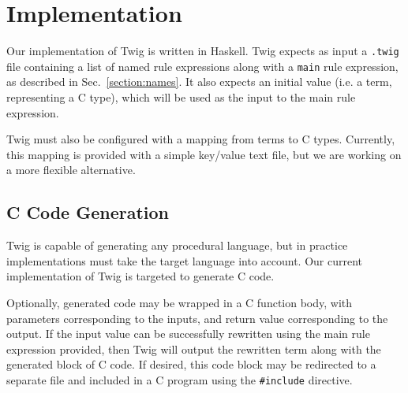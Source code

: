 
\section{Implementation}

Our implementation of Twig is written in Haskell. Twig expects as input a \texttt{.twig} file containing a list of named rule expressions along with a \texttt{main} rule expression, as described in Sec.~\ref{section:names}. It also expects an initial value (i.e. a term, representing a C type), which will be used as the input to the main rule expression.

Twig must also be configured with a mapping from terms to C types. Currently, this mapping is provided with a simple key/value text file, but we are working on a more flexible alternative.

\subsection{C Code Generation}

Twig is capable of generating any procedural language, but in practice implementations must take the target language into account. Our current implementation of Twig is targeted to generate C code.

Optionally, generated code may be wrapped in a C function body, with parameters corresponding to the inputs, and return value corresponding to the output. If the input value can be successfully rewritten using the main rule expression provided, then Twig will output the rewritten term along with the generated block of C code. If desired, this code block may be redirected to a separate file and included in a C program using the \texttt{\#include} directive.
